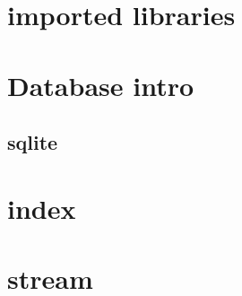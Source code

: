 \documentclass{article}
\begin{document}
\section{imported libraries}
\cleardoublepage

\section{Database intro}

\subsection{sqlite}
\cleardoublepage

\section{}
\cleardoublepage

\section{}
\cleardoublepage

\section{}
\cleardoublepage

\section{}
\cleardoublepage

\section{}
\cleardoublepage

\section{}
\cleardoublepage



\section{index}
\cleardoublepage



\section{stream}
\cleardoublepage
\end{document}
